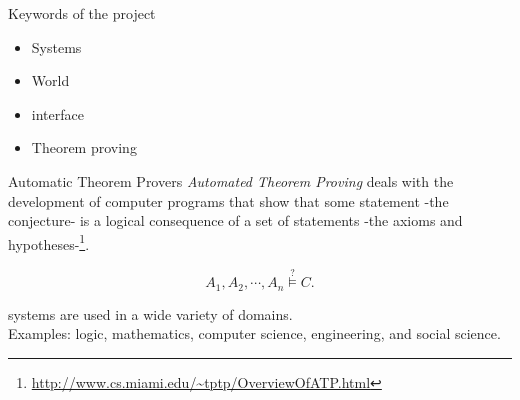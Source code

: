 \documentclass[newPxFont]{beamer}
\begin{document}
\begin{frame}
\begin{block}{Keywords of the project}
\begin{itemize}
\item \atp Systems
\item {} World
\item \systemontptp interface
\item Theorem proving
\end{itemize}
\end{block}
\end{frame}


\begin{frame}{Automatic Theorem Provers}
\emph{Automated Theorem Proving} deals with the development
 of computer programs that show that some statement
 -the conjecture- is a logical consequence of a set
 of statements -the axioms and hypotheses-\footnote{
 \url{http://www.cs.miami.edu/~tptp/OverviewOfATP.html}}.

\begin{equation}
\label{ATPs:1}
{A_{1}, A_{2}, \cdots,A_n} \stackrel{?}{\vDash} C.
\end{equation}

\atp systems are used in a wide variety of domains.\\
Examples: logic, mathematics, computer science, engineering, and social science.
\end{frame}
\end{document}
